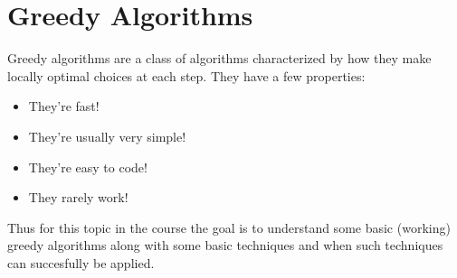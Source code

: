 \documentclass{article}
\begin{document}

\section{Greedy Algorithms}
Greedy algorithms are a class of algorithms characterized by how they make locally optimal choices at each step. They have a few properties:
\begin{itemize}
	\item They're fast!
	\item They're usually very simple!
	\item They're easy to code!
	\item They rarely work!
\end{itemize}
Thus for this topic in the course the goal is to understand some basic (working) greedy algorithms along with some basic techniques and when such techniques can succesfully be applied.
\end{document}

